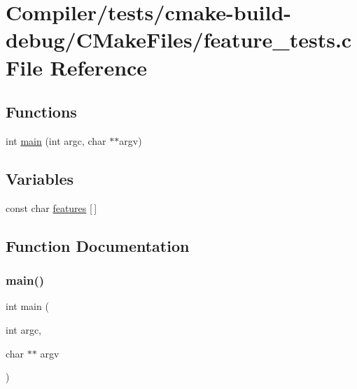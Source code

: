 \hypertarget{_compiler_2tests_2cmake-build-debug_2_c_make_files_2feature__tests_8c}{}\section{Compiler/tests/cmake-\/build-\/debug/\+C\+Make\+Files/feature\+\_\+tests.c File Reference}
\label{_compiler_2tests_2cmake-build-debug_2_c_make_files_2feature__tests_8c}
\subsection*{Functions}
\begin{DoxyCompactItemize}
\item 
int \mbox{\hyperlink{_compiler_2tests_2cmake-build-debug_2_c_make_files_2feature__tests_8c_a3c04138a5bfe5d72780bb7e82a18e627}{main}} (int argc, char $\ast$$\ast$argv)
\end{DoxyCompactItemize}
\subsection*{Variables}
\begin{DoxyCompactItemize}
\item 
const char \mbox{\hyperlink{_compiler_2tests_2cmake-build-debug_2_c_make_files_2feature__tests_8c_a1582568e32f689337602a16bf8a5bff0}{features}} \mbox{[}$\,$\mbox{]}
\end{DoxyCompactItemize}


\subsection{Function Documentation}
\mbox{\label{_compiler_2tests_2cmake-build-debug_2_c_make_files_2feature__tests_8c_a3c04138a5bfe5d72780bb7e82a18e627}} 
\subsubsection{\texorpdfstring{main()}{main()}}
{\footnotesize\ttfamily int main (\begin{DoxyParamCaption}\item[{int}]{argc,  }\item[{char $\ast$$\ast$}]{argv }\end{DoxyParamCaption})}



